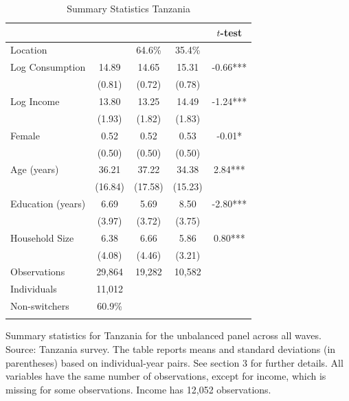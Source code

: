 \begin{table}[htbp] \centering \caption{Summary Statistics Tanzania}\label{tab:summary_stats_TZA_unb_3waves} \begin{threeparttable} \begin{tabular}{l cccc} \toprule
 &  &  &  & $t$-test \\
\midrule
Location &  &   64.6\% &   35.4\% &  \\  \addlinespace \addlinespace
Log Consumption & 14.89 & 14.65 & 15.31 & -0.66*** \\
 & (0.81) & (0.72) & (0.78) &  \\  \addlinespace
Log Income & 13.80 & 13.25 & 14.49 & -1.24*** \\
 & (1.93) & (1.82) & (1.83) &  \\  \addlinespace
Female & 0.52 & 0.52 & 0.53 & -0.01* \\
 & (0.50) & (0.50) & (0.50) &  \\  \addlinespace
Age (years) & 36.21 & 37.22 & 34.38 & 2.84*** \\
 & (16.84) & (17.58) & (15.23) &  \\  \addlinespace
Education (years) & 6.69 & 5.69 & 8.50 & -2.80*** \\
 & (3.97) & (3.72) & (3.75) &  \\  \addlinespace
Household Size & 6.38 & 6.66 & 5.86 & 0.80*** \\
 & (4.08) & (4.46) & (3.21) &  \\  \addlinespace


\cmidrule{2-5}
Observations & 29,864 & 19,282 & 10,582 &  \\  \addlinespace
Individuals & 11,012 &  &  &  \\
Non-switchers &   60.9\% &  &  &  \\  \addlinespace
\bottomrule \end{tabular} \begin{tablenotes}[flushleft] \footnotesize \item{Summary statistics for Tanzania for the unbalanced panel across all waves. Source: Tanzania survey. The table reports means and standard deviations (in parentheses) based on individual-year pairs. See section 3 for further details. All variables have the same number of observations, except for income, which is missing for some observations. Income has 12,052 observations.} \end{tablenotes} \end{threeparttable} \end{table}